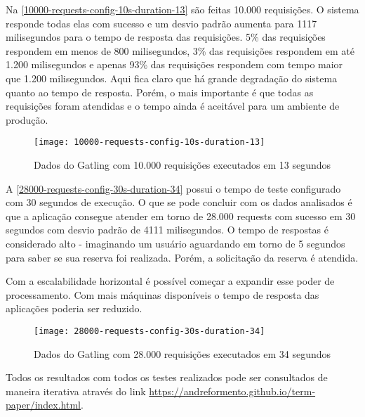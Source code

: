 Na \autoref{10000-requests-config-10s-duration-13} são feitas 10.000 requisições.
O sistema responde todas elas com sucesso e um desvio padrão aumenta para 1117 milisegundos
para o tempo de resposta das requisições.
5\% das requisições respondem em menos de 800 milisegundos, 3\% das requisições
respondem em até 1.200 milisegundos e apenas 93\% das requisições
respondem com tempo maior que 1.200 milisegundos. Aqui fica claro que há grande
degradação do sistema quanto ao tempo de resposta. Porém, o mais importante
é que todas as requisições foram atendidas e o tempo ainda é aceitável para
um ambiente de produção.

\begin{figure}[h]
  \texttt{[image: 10000-requests-config-10s-duration-13]}
  \caption{Dados do Gatling com 10.000 requisições executados em 13 segundos}
  \label{10000-requests-config-10s-duration-13}
\end{figure}

A \autoref{28000-requests-config-30s-duration-34} possui o tempo de teste configurado
com 30 segundos de execução.
O que se pode concluir com os dados analisados é que a aplicação consegue atender
em torno de 28.000 requests com sucesso em 30 segundos com desvio padrão de
4111 milisegundos.
O tempo de respostas é considerado alto - imaginando um usuário aguardando em
torno de 5 segundos para saber se sua reserva foi realizada.
Porém, a solicitação da reserva é atendida.

Com a escalabilidade horizontal é possível começar a expandir esse poder de processamento.
Com mais máquinas disponíveis o tempo de resposta das aplicações poderia ser reduzido.

\begin{figure}[h]
  \texttt{[image: 28000-requests-config-30s-duration-34]}
  \caption{Dados do Gatling com 28.000 requisições executados em 34 segundos}
  \label{28000-requests-config-30s-duration-34}
\end{figure}

Todos os resultados com todos os testes realizados pode ser consultados de maneira
iterativa através do link \url{https://andreformento.github.io/term-paper/index.html}.
